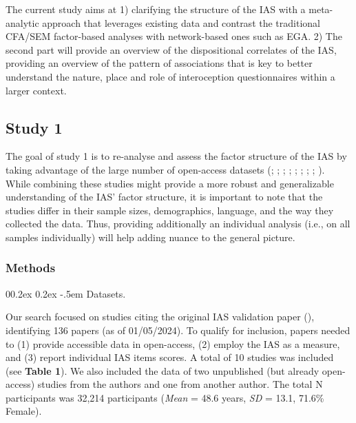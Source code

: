 \documentclass[
  man,
  floatsintext,
  longtable,
  nolmodern,
  notxfonts,
  notimes,
  colorlinks=true,linkcolor=blue,citecolor=blue,urlcolor=blue]{apa7}
\makeatletter
\renewcommand{\paragraph}{\@startsection{paragraph}{4}{\parindent}%
	{0\baselineskip \@plus 0.2ex \@minus 0.2ex}%
	{-.5em}%
	{\normalfont\normalsize\bfseries\typesectitle}}
\makeatother
\begin{document}
The current study aims at 1) clarifying the structure of the IAS with a
meta-analytic approach that leverages existing data and contrast the
traditional CFA/SEM factor-based analyses with network-based ones such
as EGA. 2) The second part will provide an overview of the dispositional
correlates of the IAS, providing an overview of the pattern of
associations that is key to better understand the nature, place and role
of interoception questionnaires within a larger context.

\subsection{Study 1}\label{study-1}

The goal of study 1 is to re-analyse and assess the factor structure of
the IAS by taking advantage of the large number of open-access datasets
(;
;
;
;
;
;
;
; ). While combining these studies might provide a more
robust and generalizable understanding of the IAS' factor structure, it
is important to note that the studies differ in their sample sizes,
demographics, language, and the way they collected the data. Thus,
providing additionally an individual analysis (i.e., on all samples
individually) will help adding nuance to the general picture.

\subsubsection{Methods}\label{methods}

\paragraph{Datasets.}\label{datasets}

Our search focused on studies citing the original IAS validation paper
(), identifying 136 papers
(as of 01/05/2024). To qualify for inclusion, papers needed to (1)
provide accessible data in open-access, (2) employ the IAS as a measure,
and (3) report individual IAS items scores. A total of 10 studies was
included (see \textbf{Table 1}). We also included the data of two
unpublished (but already open-access) studies from the authors and one
from another author. The total N participants was 32,214 participants
(\emph{Mean} = 48.6 years, \emph{SD} = 13.1, 71.6\% Female).
\end{document}
